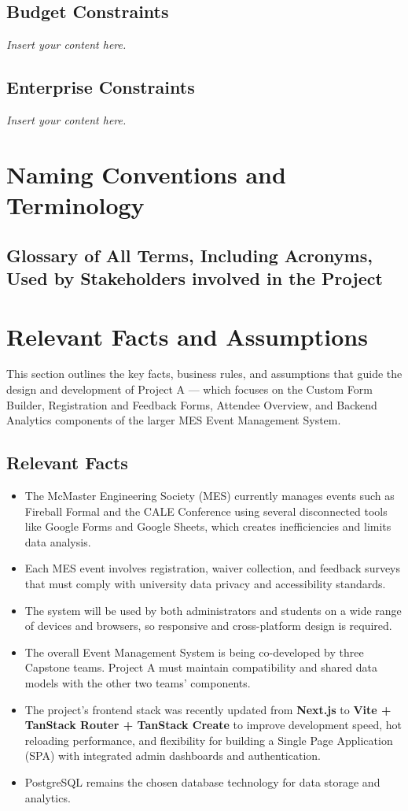 \documentclass[12pt]{article}
\newcommand{\lips}{\textit{Insert your content here.}}
\begin{document}
\subsection{Budget Constraints}
\lips
\subsection{Enterprise Constraints}
\lips

\section{Naming Conventions and Terminology}
\subsection{Glossary of All Terms, Including Acronyms, Used by Stakeholders
involved in the Project}
\printnoidxglossaries

\section{Relevant Facts and Assumptions}

This section outlines the key facts, business rules, and assumptions that guide the design and development of Project A — which focuses on the Custom Form Builder, Registration and Feedback Forms, Attendee Overview, and Backend Analytics components of the larger MES Event Management System.

\subsection{Relevant Facts}

\begin{itemize}
    \item The McMaster Engineering Society (MES) currently manages events such as Fireball Formal and the CALE Conference using several disconnected tools like Google Forms and Google Sheets, which creates inefficiencies and limits data analysis.
    \item Each MES event involves registration, waiver collection, and feedback surveys that must comply with university data privacy and accessibility standards.
    \item The system will be used by both administrators and students on a wide range of devices and browsers, so responsive and cross-platform design is required.
    \item The overall Event Management System is being co-developed by three Capstone teams. Project A must maintain compatibility and shared data models with the other two teams’ components.
    \item The project’s frontend stack was recently updated from \textbf{Next.js} to \textbf{Vite + TanStack Router + TanStack Create} to improve development speed, hot reloading performance, and flexibility for building a Single Page Application (SPA) with integrated admin dashboards and authentication.
    \item PostgreSQL remains the chosen database technology for data storage and analytics.
\end{itemize}
\end{document}
